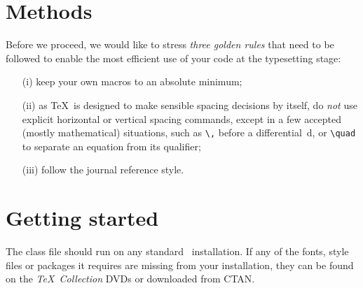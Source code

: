 \documentclass[Afour,sageh,times]{sagej}
\begin{document}
\section{Methods}
Before we proceed, we would like to stress \textit{three golden
rules} that need to be followed to enable the most efficient use
of your code at the typesetting stage:
\begin{enumerate}
\item[(i)] keep your own macros to an absolute minimum;

\item[(ii)] as \TeX\ is designed to make sensible spacing
decisions by itself, do \textit{not} use explicit horizontal or
vertical spacing commands, except in a few accepted (mostly
mathematical) situations, such as \verb"\," before a
differential~d, or \verb"\quad" to separate an equation from its
qualifier;

\item[(iii)] follow the journal reference style.
\end{enumerate}

\section{Getting started} The \textsf{\journalclassshort} class file should run
on any standard \LaTeXe\ installation. If any of the fonts, style
files or packages it requires are missing from your installation,
they can be found on the \textit{\TeX\ Collection} DVDs or downloaded from
CTAN.
\end{document}
